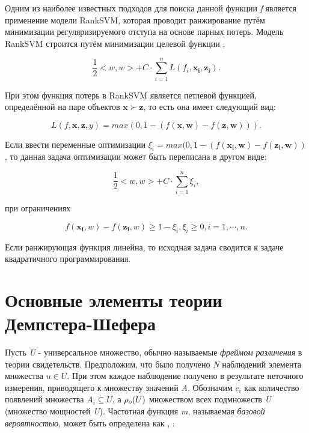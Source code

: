\documentclass[12pt,a4paper,oneside]{article}
\begin{document}
\begin{multicols}{2}
\par
Одним из наиболее известных подходов для поиска данной функции \emph{f} является применение модели RankSVM, которая проводит ранжирование путём минимизации регуляризируемого отступа на основе парных потерь. 
Модель RankSVM строится путём минимизации целевой функции , 

\[
\frac{1}{2} <w, w> + C \cdot \sum \limits_{i=1}^n L(f_i, \mathbf{x_i}, \mathbf{z_i}).
\] 

При этом функция потерь в RankSVM является петлевой функцией, определённой на паре объектов \(\mathbf{x} \succ \mathbf{z}\), то есть она имеет следующий вид:

\[
L(f, \mathbf{x}, \mathbf{z}, y) = max(0, 1 - (f(\mathbf{x}, \mathbf{w}) - f(\mathbf{z}, \mathbf{w}))).
\]

Если ввести переменные оптимизации \(\xi_i = max(0, 1 - (f(\mathbf{x_i}, \mathbf{w}) - f(\mathbf{z_i}, \mathbf{w}))\), то данная задача оптимизации может быть переписана в другом виде:

\[
\frac{1}{2}<w, w> + C \cdot \sum \limits_{i=1}^n \xi_i,
\]

при ограничениях

\[
f(\mathbf{x_i}, w) - f(\mathbf{z_i}, w) \geq 1 - \xi_i, 
\xi_i \geq 0, i = 1, \cdots, n.
\]

Если ранжирующая функция линейна, то исходная задача сводится к задаче квадратичного программирования.


\vspace*{1em}
\chapter{Основные элементы теории Демпстера-Шефера}

\par
Пусть \emph{U} - универсальное множество, обычно называемые \emph{фреймом различения} в теории свидетельств. 
Предположим, что было получено \emph{N} наблюдений элемента множества \(u \in U\).
При этом каждое наблюдение получено в результате неточного измерения, приводящего к множеству значений \emph{A}.
Обозначим \(c_i\) как количество появлений множества \(A_i \subseteq U\), а \(\mathrm{\rho}_o(U)\) множеством всех подмножеств \emph{U} (множество мощностей \emph{U}).
Частотная функция \emph{m}, называемая \emph{базовой вероятностью}, может быть определена как , :


\end{multicols}
\end{document}
